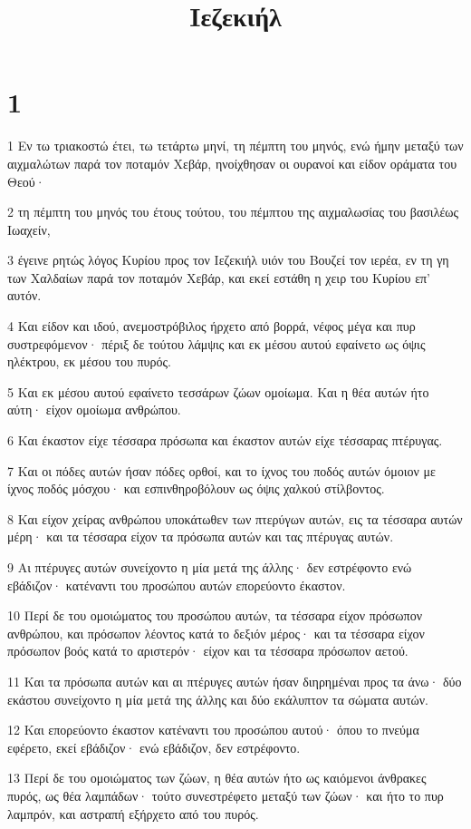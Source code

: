 

\title{Ιεζεκιήλ}


\chapter{1}

\par 1 Εν τω τριακοστώ έτει, τω τετάρτω μηνί, τη πέμπτη του μηνός, ενώ ήμην μεταξύ των αιχμαλώτων παρά τον ποταμόν Χεβάρ, ηνοίχθησαν οι ουρανοί και είδον οράματα του Θεού·
\par 2 τη πέμπτη του μηνός του έτους τούτου, του πέμπτου της αιχμαλωσίας του βασιλέως Ιωαχείν,
\par 3 έγεινε ρητώς λόγος Κυρίου προς τον Ιεζεκιήλ υιόν του Βουζεί τον ιερέα, εν τη γη των Χαλδαίων παρά τον ποταμόν Χεβάρ, και εκεί εστάθη η χειρ του Κυρίου επ' αυτόν.
\par 4 Και είδον και ιδού, ανεμοστρόβιλος ήρχετο από βορρά, νέφος μέγα και πυρ συστρεφόμενον· πέριξ δε τούτου λάμψις και εκ μέσου αυτού εφαίνετο ως όψις ηλέκτρου, εκ μέσου του πυρός.
\par 5 Και εκ μέσου αυτού εφαίνετο τεσσάρων ζώων ομοίωμα. Και η θέα αυτών ήτο αύτη· είχον ομοίωμα ανθρώπου.
\par 6 Και έκαστον είχε τέσσαρα πρόσωπα και έκαστον αυτών είχε τέσσαρας πτέρυγας.
\par 7 Και οι πόδες αυτών ήσαν πόδες ορθοί, και το ίχνος του ποδός αυτών όμοιον με ίχνος ποδός μόσχου· και εσπινθηροβόλουν ως όψις χαλκού στίλβοντος.
\par 8 Και είχον χείρας ανθρώπου υποκάτωθεν των πτερύγων αυτών, εις τα τέσσαρα αυτών μέρη· και τα τέσσαρα είχον τα πρόσωπα αυτών και τας πτέρυγας αυτών.
\par 9 Αι πτέρυγες αυτών συνείχοντο η μία μετά της άλλης· δεν εστρέφοντο ενώ εβάδιζον· κατέναντι του προσώπου αυτών επορεύοντο έκαστον.
\par 10 Περί δε του ομοιώματος του προσώπου αυτών, τα τέσσαρα είχον πρόσωπον ανθρώπου, και πρόσωπον λέοντος κατά το δεξιόν μέρος· και τα τέσσαρα είχον πρόσωπον βοός κατά το αριστερόν· είχον και τα τέσσαρα πρόσωπον αετού.
\par 11 Και τα πρόσωπα αυτών και αι πτέρυγες αυτών ήσαν διηρημέναι προς τα άνω· δύο εκάστου συνείχοντο η μία μετά της άλλης και δύο εκάλυπτον τα σώματα αυτών.
\par 12 Και επορεύοντο έκαστον κατέναντι του προσώπου αυτού· όπου το πνεύμα εφέρετο, εκεί εβάδιζον· ενώ εβάδιζον, δεν εστρέφοντο.
\par 13 Περί δε του ομοιώματος των ζώων, η θέα αυτών ήτο ως καιόμενοι άνθρακες πυρός, ως θέα λαμπάδων· τούτο συνεστρέφετο μεταξύ των ζώων· και ήτο το πυρ λαμπρόν, και αστραπή εξήρχετο από του πυρός.
